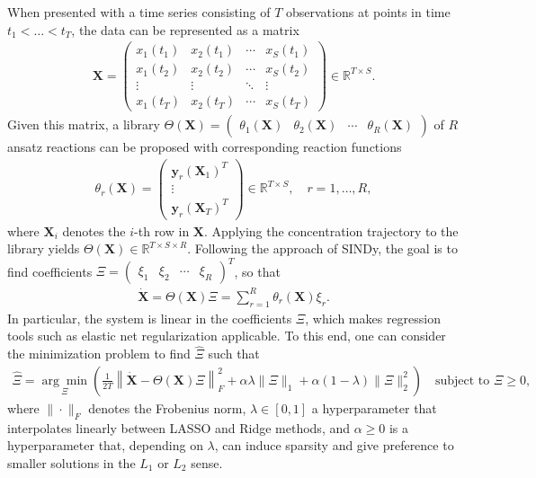 \documentclass[oneside, abstracton, titlepage]{scrartcl}
\begin{document}
	When presented with a time series consisting of $T$ observations at points in time $t_1<\ldots < t_T$, the data can be represented as a matrix
	\begin{align}
	\textbf{X} = \begin{pmatrix}
		x_1(t_1) & x_2(t_1) & \cdots & x_S(t_1) \\
		x_1(t_2) & x_2(t_2) & \cdots & x_S(t_2) \\
		\vdots   & \vdots   & \ddots & \vdots   \\
		x_1(t_T) & x_2(t_T) & \cdots & x_S(t_T)
	\end{pmatrix} \in \mathbb{R}^{T\times S}.
	\end{align}
	Given this matrix, a library $\Theta(\textbf{X}) = \begin{pmatrix} \theta_1(\textbf{X}) & \theta_2(\textbf{X}) & \cdots & \theta_R(\textbf{X}) \end{pmatrix}$ of $R$ ansatz reactions can be proposed with corresponding reaction functions
	\begin{align}
		\theta_r(\textbf{X}) = \begin{pmatrix}
		\textbf{y}_r(\textbf{X}_1)^T \\ \vdots \\ \textbf{y}_r(\textbf{X}_T)^T
		\end{pmatrix}\in \mathbb{R}^{T\times S},\quad r=1,\ldots,R,
	\label{method:the-reactions}\end{align}
	where $\textbf{X}_i$ denotes the $i$-th row in $\textbf{X}$. Applying the concentration trajectory to the library yields $\Theta(\textbf{X})\in\mathbb{R}^{T\times S\times R}$. Following the approach of SINDy, the goal is to find coefficients $\Xi = \begin{pmatrix} \xi_1 & \xi_2 & \cdots & \xi_R
	\end{pmatrix}^T$, so that
	\begin{align}
	\dot{\textbf{X}} = \Theta(\textbf{X})\Xi = \sum_{r=1}^{R}\theta_r(\textbf{X})\xi_r.
	\end{align}
	In particular, the system is linear in the coefficients $\Xi$, which makes regression tools such as elastic net regularization \cite{Zou2005} applicable. To this end, one can consider the minimization problem to find $\hat{\Xi}$ such that
	\begin{align}
		\hat{\Xi} = \underset{\Xi}{\arg\min}\left( \frac{1}{2T}\left\| \dot{\textbf{X}} - \Theta(\textbf{X})\Xi \right\|_F^2 + \alpha\lambda\|\Xi\|_1 + \alpha(1-\lambda)\|\Xi\|_2^2 \right) \quad \text{subject to }\Xi \geq 0,
	\label{method:minimizationproblem}\end{align}
	where $\|\cdot\|_F$ denotes the Frobenius norm, $\lambda\in[0,1]$ a hyperparameter that interpolates linearly between LASSO \cite{Tibshirani1996, Hastie2009} and Ridge \cite{Hoerl1} methods, and $\alpha\geq 0$ is a hyperparameter that, depending on $\lambda$, can induce sparsity and give preference to smaller solutions in the $L_1$ or $L_2$ sense.
\end{document}
